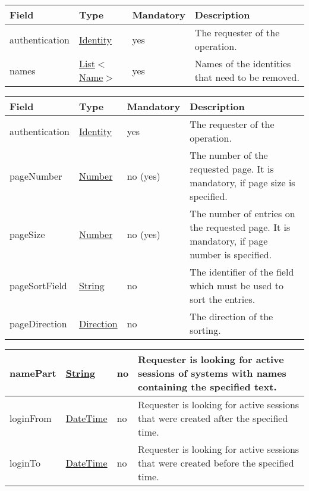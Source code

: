 \documentclass[a4paper]{arrowhead}
\newcommand{\pref}[1]{{\textcolor{ArrowheadGrey}{\hyperref[sec:model:primitives:#1]{#1}}}}
\begin{document}

\begin{table}[ht!]
\begin{tabularx}{\textwidth}{| p{2.5cm} | p{2.5cm} | p{2cm} | X |} \hline
\rowcolor{gray!33} Field & Type & Mandatory & Description \\ \hline
authentication & \hyperref[sec:model:Identity]{Identity} & yes & The requester of the operation. \\ \hline
names &  \pref{List}$<$\pref{Name}$>$ & yes & Names of the identities that need to be removed. \\ \hline
\end{tabularx}
\end{table}


\begin{table}[ht!]
\begin{tabularx}{\textwidth}{| p{4.3cm} | p{4.8cm} | p{2cm} | X |} \hline
\rowcolor{gray!33} Field & Type & Mandatory & Description \\ \hline
authentication & \hyperref[sec:model:Identity]{Identity} & yes & The requester of the operation. \\ \hline
pageNumber & \pref{Number} & no (yes) & The number of the requested page. It is mandatory, if page size is specified. \\ \hline
pageSize & \pref{Number} & no (yes) & The number of entries on the requested page. It is mandatory, if page number is specified. \\ \hline
pageSortField & \pref{String} & no & The identifier of the field which must be used to sort the entries. \\ \hline
pageDirection & \pref{Direction} & no & The direction of the sorting. \\ \hline
\end{tabularx}
\end{table}

\begin{table}[ht!]
\begin{tabularx}{\textwidth}{| p{4.3cm} | p{4.8cm} | p{2cm} | X |} \hline
namePart &  \pref{String} & no & Requester is looking for active sessions of systems with names containing the specified text. \\ \hline
loginFrom &  \pref{DateTime} & no & Requester is looking for active sessions that were created after the specified time. \\ \hline
loginTo &  \pref{DateTime} & no & Requester is looking for active sessions that were created before the specified time. \\ \hline
\end{tabularx}
\end{table}
\end{document}
